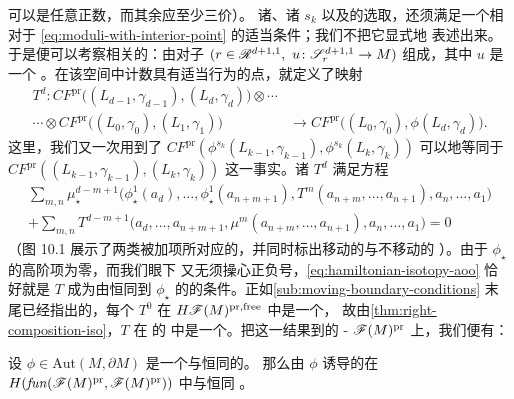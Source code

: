 \trValency{}可以是任意正数，而其余\trVertex{}应至少三价）。
诸\trStriplikeEnd{}、诸 $s_k$ 以及\trPerturbationDatum{}的选取，还须满足一个相对于
\eqref{eq:moduli-with-interior-point} 的适当\trConsistency{}条件；我们不把它显式地%
表述出来。于是便可以考察相关的\trModuliSpace{}：由对子
$(r\in\scr{R}^{d+1,1},\ u\colon\scr{S}^{d+1,1}_r\to M)$ 组成，其中 $u$ 是一个%
\trInhomogeneous\trPseudoholomorphicMap。在该空间中计数具有适当\trAsymptotic{}行为的点，就定义了映射
\begin{equation*}
\begin{split}
T^d\colon CF^{\mathrm{pr}}\bigl((L_{d-1},\gamma_{d-1}),(L_d,\gamma_d)\bigr)\otimes\cdots\\
\cdots\otimes CF^{\mathrm{pr}}\bigl((L_0,\gamma_0),(L_1,\gamma_1)\bigr)
&\longrightarrow CF^{\mathrm{pr}}\bigl((L_0,\gamma_0),\phi(L_d,\gamma_d)\bigr).
\end{split}
\end{equation*}
这里，我们又一次用到了
$CF^{\mathrm{pr}}(\phi^{s_k}(L_{k-1},\gamma_{k-1}),\phi^{s_k}(L_k,\gamma_k))$
可以\trCanonical{}地等同于
$CF^{\mathrm{pr}}((L_{k-1},\gamma_{k-1}),(L_k,\gamma_k))$ 这一事实。诸 $T^d$ 满足方程
\begin{equation}\label{eq:hamiltonian-isotopy-aoo}
\begin{split}
\sum_{m,n}\mu^{d-m+1}_\star\bigl(\phi_\star^1(a_d),\ldots,\phi_\star^1(a_{n+m+1}),%
T^m(a_{n+m},\ldots,a_{n+1}),a_n,\ldots,a_1\bigr)\\
+\sum_{m,n}T^{d-m+1}\bigl(a_d,\ldots,a_{n+m+1},\mu^m(a_{n+m},\ldots,a_{n+1}),a_n,\ldots,a_1\bigr)=0
\end{split}
\end{equation}
（图 10.1 展示了两类被加项所对应的\trDegenerate，并同时标出移动的与不移动的%
\trBoundaryCondition）。由于\trAFunctor{} $\phi_\star$ 的高阶项为零，而我们眼下%
又无须操心正负号，\eqref{eq:hamiltonian-isotopy-aoo} 恰好就是 $T$ 成为由恒同到
$\phi_\star$ 的\trNaturalTransformation{}的条件。正如\cref{sub:moving-boundary-conditions}
末尾已经指出的，每个 $T^0$ 在 $H\mathscr{F}(M)^{\mathrm{pr,free}}$ 中是一个\trIsomorphism，%
故由\cref{thm:right-composition-iso}，$T$ 在 \trAFunctor{}的\trCohomology\trCategory{}%
中是一个\trIsomorphism。把这一结果\trTransfer{}到\trQuasiequivalence{}的%
\trAinfty-\trCategory{} $\mathscr{F}(M)^{\mathrm{pr}}$ 上，我们便有：
\begin{proposition}\label{thm:hamiltonian-isotopy-iso}
设 $\phi\in\mathrm{Aut}(M,\partial M)$ 是一个与恒同\trIsotopy{}的\trAutomorphism。%
那么由 $\phi$ 诱导的\trAFunctor{}在
$H(\mathit{fun}(\mathscr{F}(M)^{\mathrm{pr}},\mathscr{F}(M)^{\mathrm{pr}}))$ 中与恒同\trFunctor{}%
\trIsomorphic。\noqed
\end{proposition}
